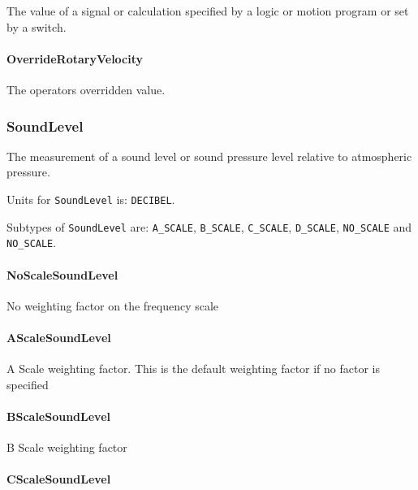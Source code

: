 The value of a signal or calculation specified by a logic or motion program or set by a switch.


\paragraph{OverrideRotaryVelocity}\mbox{}
\label{sec:OverrideRotaryVelocity}



The operators overridden value.


\subsubsection{SoundLevel}
\label{sec:SoundLevel}



The measurement of a sound level or sound pressure level relative to atmospheric pressure.


Units for \texttt{SoundLevel} is: \texttt{DECIBEL}.


Subtypes of \texttt{SoundLevel} are: \texttt{A_SCALE}, \texttt{B_SCALE}, \texttt{C_SCALE}, \texttt{D_SCALE}, \texttt{NO_SCALE} and \texttt{NO_SCALE}. 
\FloatBarrier

\paragraph{NoScaleSoundLevel}\mbox{}
\label{sec:NoScaleSoundLevel}



No weighting factor on the frequency scale


\paragraph{AScaleSoundLevel}\mbox{}
\label{sec:AScaleSoundLevel}



A Scale weighting factor.   This is the default weighting factor if no factor is specified


\paragraph{BScaleSoundLevel}\mbox{}
\label{sec:BScaleSoundLevel}



B Scale weighting factor


\paragraph{CScaleSoundLevel}\mbox{}
\label{sec:CScaleSoundLevel}



